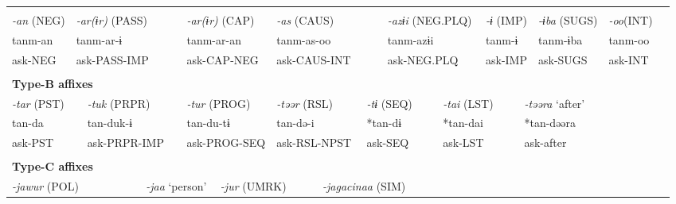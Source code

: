 \tabletail{}
\tablelasttail{}
\begin{tabularx}{\textwidth}{XXXXXXXXXXXXXXXXXXXXX}
\lsptoprule
\multicolumn{21}{X}{{\bfseries Type-A affixes}}\\
{ \textit{{}-an} (NEG)} & \multicolumn{4}{X}{{ \textit{{}-ar(ɨr)} (PASS)}} & \multicolumn{4}{X}{{ \textit{{}-ar(ɨr)} (CAP)}} & \multicolumn{4}{X}{{ \textit{{}-as} (CAUS)}} & \multicolumn{3}{X}{{ \textit{{}-azɨi} (NEG.PLQ)}} & \multicolumn{2}{X}{{ \textit{{}-ɨ} (IMP)}} & { \textit{{}-ɨba} (SUGS)} & { \textit{{}-oo}(INT)} & \\
{ tanm-an} & \multicolumn{4}{X}{{ tanm-ar-ɨ}} & \multicolumn{4}{X}{{ tanm-ar-an}} & \multicolumn{4}{X}{{ tanm-as-oo}} & \multicolumn{3}{X}{{ tanm-azɨi}} & \multicolumn{2}{X}{{ tanm-ɨ}} & { tanm-ɨba} & { tanm-oo} & \\
ask-NEG & \multicolumn{4}{X}{ask-PASS-IMP} & \multicolumn{4}{X}{ask-CAP-NEG} & \multicolumn{4}{X}{ask-CAUS-INT} & \multicolumn{3}{X}{ask-NEG.PLQ} & \multicolumn{2}{X}{ask-IMP} & ask-SUGS & ask-INT & \\
\multicolumn{21}{X}{}\\
\multicolumn{21}{X}{{\bfseries Type-B affixes}}\\
\multicolumn{2}{X}{{ \textit{{}-tar} (PST)}} & \multicolumn{3}{X}{{ \textit{{}-tuk} (PRPR)}} & \multicolumn{4}{X}{{ \textit{{}-tur} (PROG)}} & \multicolumn{3}{X}{{ \textit{{}-təər} (RSL)}} & \multicolumn{3}{X}{{ \textit{{}-tɨ} (SEQ)}} & \multicolumn{2}{X}{{ \textit{{}-tai} (LST)}} & \multicolumn{4}{X}{{ \textit{{}-təəra} ‘after’}}\\
\multicolumn{2}{X}{{ tan-da}} & \multicolumn{3}{X}{{ tan-duk-ɨ}} & \multicolumn{4}{X}{{ tan-du-tɨ}} & \multicolumn{3}{X}{{ tan-də-i}} & \multicolumn{3}{X}{{ *tan-dɨ}} & \multicolumn{2}{X}{{ *tan-dai}} & \multicolumn{4}{X}{{ *tan-dəəra}}\\
\multicolumn{2}{X}{ask-PST} & \multicolumn{3}{X}{ask-PRPR-IMP} & \multicolumn{4}{X}{ask-PROG-SEQ} & \multicolumn{3}{X}{ask-RSL-NPST} & \multicolumn{3}{X}{ask-SEQ} & \multicolumn{2}{X}{ask-LST} & \multicolumn{4}{X}{{ ask-after}}\\
\multicolumn{2}{X}{} & \multicolumn{3}{X}{} & \multicolumn{4}{X}{} & \multicolumn{3}{X}{} & \multicolumn{3}{X}{} & \multicolumn{2}{X}{} & \multicolumn{4}{X}{}\\
\multicolumn{21}{X}{{\bfseries Type-C affixes}}\\
\multicolumn{4}{X}{{ \textit{{}-jawur} (POL)}} & \multicolumn{3}{X}{{ \textit{{}-jaa} ‘person’}} & \multicolumn{3}{X}{{ \textit{{}-jur} (UMRK)}} & \multicolumn{4}{X}{{ \textit{{}-jagacinaa} (SIM)}} & \multicolumn{7}{X}{}\\

\end{tabularx}
